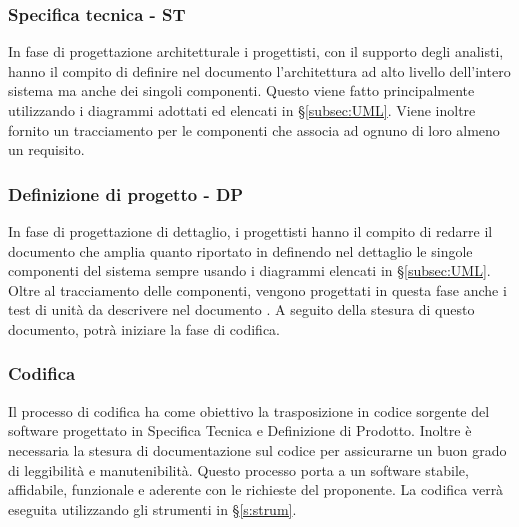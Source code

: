 \documentclass[a4paper,11pt]{article}
\begin{document}
		\subsubsection{Specifica tecnica - ST}
		In fase di progettazione architetturale i progettisti, con il supporto degli analisti, hanno il compito di definire nel documento   l'architettura ad alto livello dell'intero sistema ma anche dei singoli componenti. Questo viene fatto principalmente utilizzando i diagrammi adottati ed elencati in §\ref{subsec:UML}. Viene inoltre fornito un tracciamento per le componenti che associa ad ognuno di loro almeno un requisito. 
		\subsubsection{Definizione di progetto - DP}	
		In fase di progettazione di dettaglio, i progettisti hanno il compito di redarre il documento  che amplia quanto riportato in  definendo nel dettaglio le singole componenti del sistema sempre usando i diagrammi elencati in §\ref{subsec:UML}. Oltre al tracciamento delle componenti, vengono progettati in questa fase anche i test di unità da descrivere nel documento . A seguito della stesura di questo documento, potrà iniziare la fase di codifica.
		\subsubsection{Codifica}
			Il processo di codifica ha come obiettivo la trasposizione in codice sorgente del software progettato in Specifica Tecnica e Definizione di Prodotto. Inoltre è necessaria la stesura di documentazione sul codice per assicurarne un buon grado di leggibilità e manutenibilità.
				Questo processo porta a un software stabile, affidabile, funzionale e aderente con le richieste del proponente. La codifica verrà eseguita utilizzando gli strumenti in §\ref{s:strum}. 
			
\end{document}

